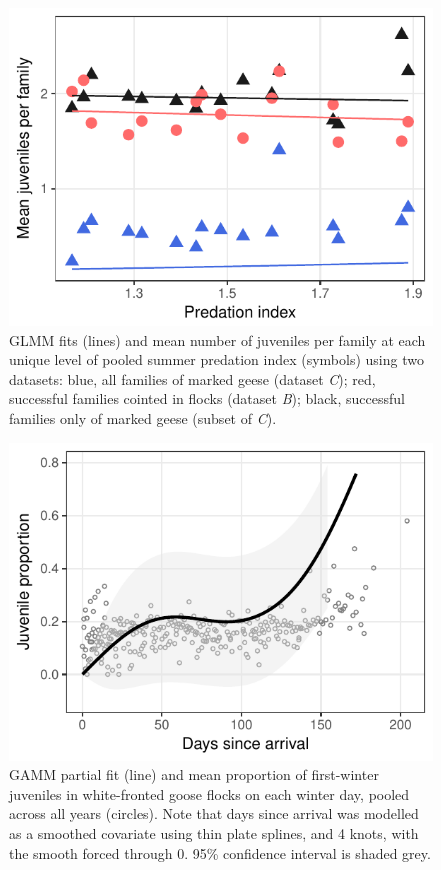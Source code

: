 \documentclass[10pt,twocolumn]{paper}
\begin{document}
\begin{figure}[H]
\includegraphics[width = 1\linewidth]{fam_predation.pdf}
\caption{{\small GLMM fits (lines) and mean number of juveniles per family at each
unique level of pooled summer predation index (symbols) using two
datasets: blue, all families of marked geese (dataset \emph{C}); red,
successful families cointed in flocks (dataset \emph{B}); black,
successful families only of marked geese (subset of \emph{C}).}}
\end{figure}

\begin{figure}[H]
\includegraphics[width = 1\linewidth]{juvprop_time.pdf}
\caption{{\small GAMM partial fit (line) and mean proportion of first-winter juveniles in
white-fronted goose flocks on each winter day, pooled across all years
(circles). Note that days since arrival was modelled as a smoothed
covariate using thin plate splines, and 4 knots, with the smooth forced
through 0. 95\% confidence interval is shaded grey.}}
\end{figure}
\end{document}
